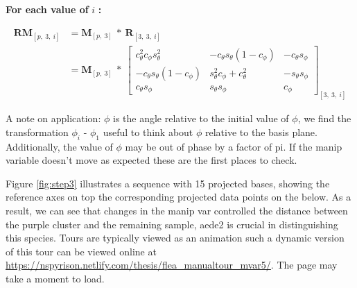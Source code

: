 \textbf{For each value of } \(i\) \textbf{:}

\begin{align*}
  \textbf{RM}_{[p,~3,~i]}
  &= \textbf{M}_{[p,~3]} ~*~ \textbf{R}_{[3,~3,~i]} \\
  &= \textbf{M}_{[p,~3]}
    ~*~
  \begin{bmatrix}
    c_\theta^2 c_\phi s_\theta^2 &
    -c_\theta s_\theta (1 - c_\phi) &
    -c_\theta s_\phi \\
    -c_\theta s_\theta (1 - c_\phi) &
    s_\theta^2 c_\phi + c_\theta^2 &
    -s_\theta s_\phi \\
    c_\theta s_\phi &
    s_\theta s_\phi &
    c_\phi
  \end{bmatrix}_{[3,~3,~i]}
\end{align*}

A note on application: \(\phi\) is the angle relative to the initial
value of \(\phi\), we find the transformation \(\phi_i\) - \(\phi_1\)
useful to think about \(\phi\) relative to the basis plane.
Additionally, the value of \(\phi\) may be out of phase by a factor of
pi. If the manip variable doesn't move as expected these are the first
places to check.

Figure \ref{fig:step3} illustrates a sequence with 15 projected bases,
showing the reference axes on top the corresponding projected data
points on the below. As a result, we can see that changes in the manip
var controlled the distance between the purple cluster and the remaining
sample, aede2 is crucial in distinguishing this species. Tours are
typically viewed as an animation such a dynamic version of this tour can
be viewed online at
\url{https://nspyrison.netlify.com/thesis/flea_manualtour_mvar5/}. The
page may take a moment to load.

